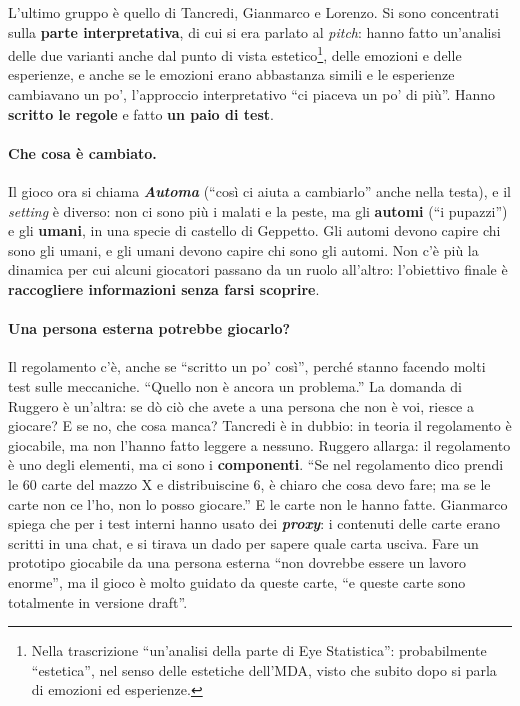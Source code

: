 L'ultimo gruppo è quello di Tancredi, Gianmarco e Lorenzo. Si sono concentrati sulla
\textbf{parte interpretativa}, di cui si era parlato al \emph{pitch}: hanno fatto
un'analisi delle due varianti anche dal punto di vista estetico\footnote{Nella
trascrizione ``un'analisi della parte di Eye Statistica'': probabilmente ``estetica'', nel
senso delle estetiche dell'MDA, visto che subito dopo si parla di emozioni ed
esperienze.}, delle emozioni e delle esperienze, e anche se le emozioni erano abbastanza simili e le esperienze cambiavano
un po', l'approccio interpretativo ``ci piaceva un po' di più''. Hanno \textbf{scritto le
regole} e fatto \textbf{un paio di test}.

\paragraph{Che cosa è cambiato.} Il gioco ora si chiama \textbf{\emph{Automa}} (``così ci
aiuta a cambiarlo'' anche nella testa), e il \emph{setting} è diverso: non ci sono più i
malati e la peste, ma gli \textbf{automi} (``i pupazzi'') e gli \textbf{umani}, in una
specie di castello di Geppetto. Gli automi devono capire chi sono gli umani, e gli umani
devono capire chi sono gli automi. Non c'è più la dinamica per cui alcuni giocatori passano
da un ruolo all'altro: l'obiettivo finale è \textbf{raccogliere informazioni senza farsi
scoprire}.

\paragraph{Una persona esterna potrebbe giocarlo?} Il regolamento c'è, anche se ``scritto
un po' così'', perché stanno facendo molti test sulle meccaniche. ``Quello non è ancora un
problema.'' La domanda di Ruggero è un'altra: se dò ciò che avete a una persona che non è
voi, riesce a giocare? E se no, che cosa manca? Tancredi è in dubbio: in teoria il
regolamento è giocabile, ma non l'hanno fatto leggere a nessuno. Ruggero allarga: il
regolamento è uno degli elementi, ma ci sono i \textbf{componenti}. ``Se nel regolamento
dico prendi le 60 carte del mazzo X e distribuiscine 6, è chiaro che cosa devo fare; ma se
le carte non ce l'ho, non lo posso giocare.'' E le carte non le hanno fatte. Gianmarco
spiega che per i test interni hanno usato dei \textbf{\emph{proxy}}: i contenuti delle
carte erano scritti in una chat, e si tirava un dado per sapere quale carta usciva. Fare un
prototipo giocabile da una persona esterna ``non dovrebbe essere un lavoro enorme'', ma il
gioco è molto guidato da queste carte, ``e queste carte sono totalmente in versione
draft''.

